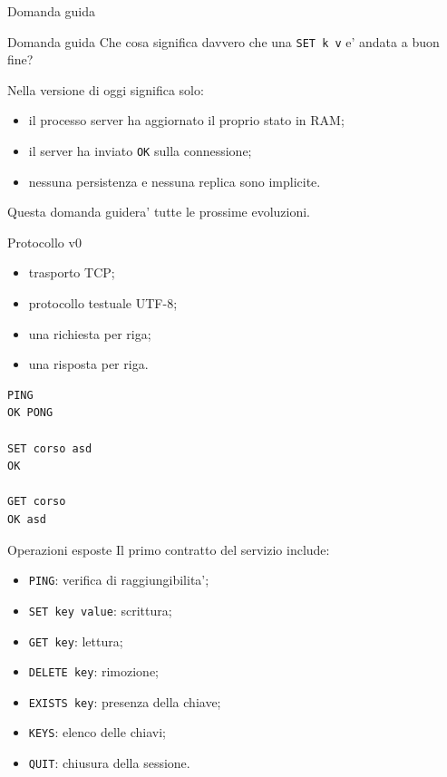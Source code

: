 \documentclass[aspectratio=169]{beamer}
\begin{document}
\begin{frame}{Domanda guida}
  \begin{alertblock}{Domanda guida}
    Che cosa significa davvero che una \texttt{SET k v} e' andata a buon fine?
  \end{alertblock}

  Nella versione di oggi significa solo:

  \begin{itemize}
    \item il processo server ha aggiornato il proprio stato in RAM;
    \item il server ha inviato \texttt{OK} sulla connessione;
    \item nessuna persistenza e nessuna replica sono implicite.
  \end{itemize}

  Questa domanda guidera' tutte le prossime evoluzioni.
\end{frame}

\begin{frame}[fragile]{Protocollo v0}
  \begin{itemize}
    \item trasporto TCP;
    \item protocollo testuale UTF-8;
    \item una richiesta per riga;
    \item una risposta per riga.
  \end{itemize}

  \begin{lstlisting}
PING
OK PONG

SET corso asd
OK

GET corso
OK asd
  \end{lstlisting}
\end{frame}

\begin{frame}{Operazioni esposte}
  Il primo contratto del servizio include:

  \begin{itemize}
    \item \texttt{PING}: verifica di raggiungibilita';
    \item \texttt{SET key value}: scrittura;
    \item \texttt{GET key}: lettura;
    \item \texttt{DELETE key}: rimozione;
    \item \texttt{EXISTS key}: presenza della chiave;
    \item \texttt{KEYS}: elenco delle chiavi;
    \item \texttt{QUIT}: chiusura della sessione.
  \end{itemize}
\end{frame}
\end{document}
